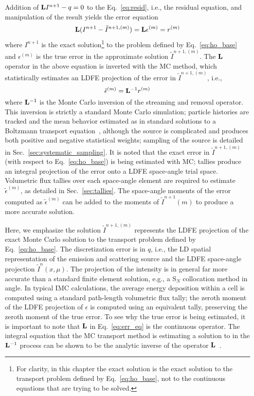 Addition of $\mathbf{L} I^{n+1} - q=0$ to the Eq.~\eqref{eq:resid}, i.e., the residual equation,
and manipulation of the result yields the error equation
\begin{equation}\label{eq:err_eq}
    \mathbf{L} (I^{n+1} - \tilde{I}^{n+1,(m)}) = \mathbf{L} {\epsilon}^{(m)} = r^{(m)}
\end{equation}
where $I^{n+1}$ is the exact solution\footnote{For clarity, in this chapter the exact solution is the
    exact solution to the transport problem defined by Eq.~\eqref{eq:ho_base}, not to the
continuous equations that are trying to be solved.}  to the problem defined by Eq.~\eqref{eq:ho_base} and
${\epsilon}^{(m)}$ is the true error in the approximate solution $\tilde{I}^{n+1,(m)}$. 
The $\mathbf{L}$ operator in the above equation is inverted with the MC method, which
statistically estimates an LDFE projection of the error in $\tilde{I}^{n+1,(m)}$, i.e., 
\begin{equation}\label{eq:mc_err}
\tilde{\epsilon}^{(m)} = \mathbf{L}^{-1} r^{(m)}
\end{equation}
where $\mathbf{L}^{-1}$ is the Monte Carlo inversion of the streaming and removal operator.  
This inversion is strictly a standard Monte Carlo simulation; particle histories are
tracked and the mean behavior estimated as in standard solutions to a Boltzmann transport
equation~\cite{shultic_mc,mcnp}, although the source is
complicated and produces both positive and negative statistical weights; sampling of the
source is detailed in Sec.~\ref{sec:systematic_sampling}.  
It is noted that the exact error in $\tilde{I}^{n+1,(m)}$ (with respect to
Eq.~\eqref{eq:ho_base}) is being estimated with MC;
tallies produce an integral projection of the error onto a LDFE space-angle trial space. 
Volumetric flux tallies over each space-angle element are required to estimate
$\tilde{\epsilon}^{(m)}$, as detailed in Sec.~\ref{sec:tallies}.  
The
space-angle moments of the error computed as $\tilde{\epsilon}^{(m)}$ can be added to the
moments of $\tilde{I}^{n+1}(m)$ to produce a more accurate solution.  

Here, we emphasize the solution $\tilde{I}^{n+1,(m)}$ represents the LDFE projection of the exact Monte Carlo
solution to the transport problem defined by Eq.~\eqref{eq:ho_base}.  The discretization error is in $q$, i.e., the LD spatial
representation of the emission and scattering source and the LDFE space-angle projection $\tilde I^{n}(x,\mu)$.
 The projection of the intensity is in
general far more accurate than a standard finite element solution, e.g., a S$_N$ collocation method in angle.  In typical IMC calculations, the average
energy deposition within a cell is computed using a standard path-length volumetric
flux tally; the zeroth moment of the LDFE projection of ${\epsilon}$ is
computed using an equivalent tally, preserving the zeroth moment of the true error.
To see why the true error is being estimated, it is important to note that 
$\mathbf{L}$ in Eq.~\eqref{eq:err_eq} is the continuous operator.  The integral equation that
the MC transport method is estimating a solution to in the $\mathbf{L}^{-1}$ process can be
shown to be the analytic inverse of the operator $\mathbf{L}$~\cite{shultis_mc,cj_thesis}.  

